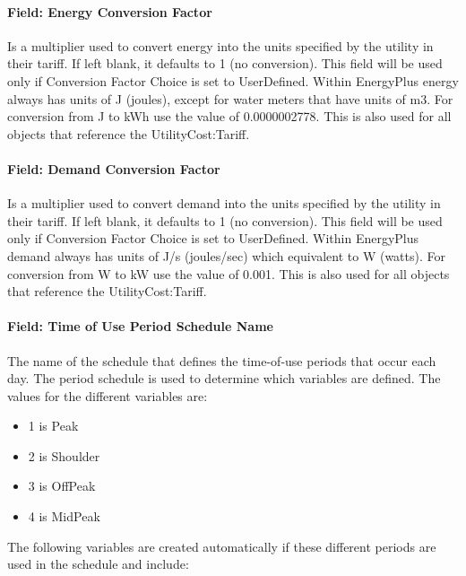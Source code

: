 \paragraph{Field: Energy Conversion Factor}\label{field-energy-conversion-factor}

Is a multiplier used to convert energy into the units specified by the utility in their tariff. If left blank, it defaults to 1 (no conversion). This field will be used only if Conversion Factor Choice is set to UserDefined. Within EnergyPlus energy always has units of J (joules), except for water meters that have units of m3. For conversion from J to kWh use the value of 0.0000002778. This is also used for all objects that reference the UtilityCost:Tariff.

\paragraph{Field: Demand Conversion Factor}\label{field-demand-conversion-factor}

Is a multiplier used to convert demand into the units specified by the utility in their tariff. If left blank, it defaults to 1 (no conversion). This field will be used only if Conversion Factor Choice is set to UserDefined. Within EnergyPlus demand always has units of J/s (joules/sec) which equivalent to W (watts). For conversion from W to kW use the value of 0.001. This is also used for all objects that reference the UtilityCost:Tariff.

\paragraph{Field: Time of Use Period Schedule Name}\label{field-time-of-use-period-schedule-name}

The name of the schedule that defines the time-of-use periods that occur each day. The period schedule is used to determine which variables are defined. The values for the different variables are:

\begin{itemize}
\item
  1 is Peak
\item
  2 is Shoulder
\item
  3 is OffPeak
\item
  4 is MidPeak
\end{itemize}

The following variables are created automatically if these different periods are used in the schedule and include:

